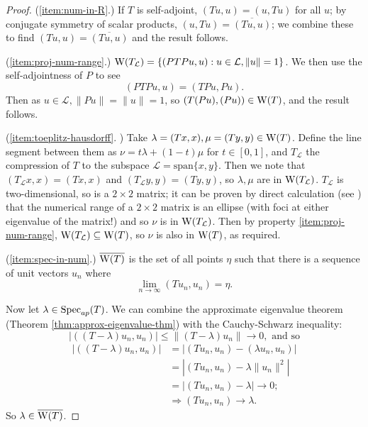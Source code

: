 \documentclass[../main.tex]{subfiles}
\begin{document}
\begin{proof}
(\ref{item:num-in-R}.) If $T$ is self-adjoint, 
$(Tu, u) = (u, Tu)$ for all $u$;
by conjugate symmetry of scalar products, 
$(u, Tu) = \overline{(Tu, u)}$;
we combine these to find 
$(Tu, u) = \overline{(Tu, u)}$
and the result follows. 

(\ref{item:proj-num-range}.) 
$\mathrm{W}(T_\mathcal{L}) = \{( PTPu, u ) : u \in \mathcal{L}, \|u\|=1\}$.
We then use the self-adjointness of $P$ to see
$$( PTPu, u ) = ( TPu, Pu ).$$
Then as $u \in \mathcal{L}, \|Pu\| = \|u\| = 1$,
so $( T(Pu), (Pu) ) \in \mathrm{W}(T)$, and the result follows.

(\ref{item:toeplitz-hausdorff}. 
\cite{gustafson1997numerical})
Take $\lambda = (Tx, x), \mu = (Ty, y) \in \mathrm{W}(T)$. Define the line segment
between them as $\nu = t\lambda + (1-t)\mu$ for $t \in [0, 1]$, and
$T_\mathcal{L}$ the compression of $T$ to the subspace 
$\mathcal{L} = \text{span}\{x, y\}$.
Then we note that $(T_\mathcal{L} x, x) = (Tx, x)$ and $(T_\mathcal{L} y, y) =
(Ty, y)$, so $\lambda, \mu$ are in $\mathrm{W}(T_\mathcal{L})$.
$T_\mathcal{L}$ is two-dimensional, so is a $2 \times 2$ matrix; it can
be proven by direct calculation (see \cite{gustafson1997numerical}) that
the numerical range of a $2 \times 2$ matrix is an ellipse (with foci at
either eigenvalue of the matrix!) and so $\nu$ is in
$\mathrm{W}(T_\mathcal{L})$.
Then by property \ref{item:proj-num-range}, $\mathrm{W}(T_\mathcal{L}) \subseteq
\mathrm{W}(T)$, so $\nu$ is also in $\mathrm{W}(T)$, as required.

(\ref{item:spec-in-num}.) $\overline{\mathrm{W}(T)}$ is the set of all points $\eta$
such that there is a sequence of unit vectors $u_n$ where
$$\lim_{n\rightarrow \infty}( Tu_n, u_n ) = \eta.$$

Now let $\lambda \in \mathrm{Spec}_{ap}(T)$. We can combine the approximate eigenvalue
theorem (Theorem \ref{thm:approx-eigenvalue-thm}) with the
Cauchy-Schwarz inequality: 
$$|( (T - \lambda)u_n, u_n )| \leq \|(T - \lambda)u_n\| \rightarrow 0,\text{ and so}$$
\begin{equation*}
\begin{split}
|( (T - \lambda)u_n, u_n )| &  = |(Tu_n, u_n) - ( \lambda u_n, u_n )| \\
& = |(Tu_n, u_n) - \lambda \|u_n\|^2| \\
& = |(Tu_n, u_n) - \lambda| \rightarrow 0; \\
& \Rightarrow ( Tu_n, u_n ) \rightarrow \lambda.
\end{split}
\end{equation*}
So $\lambda \in \overline{\mathrm{W}(T)}$.
\end{proof}
\end{document}
